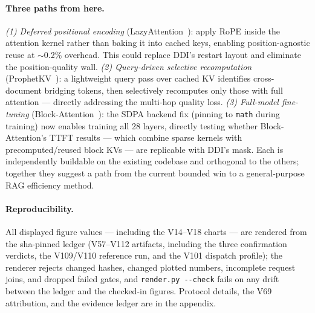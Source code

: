 \paragraph{Three paths from here.}
\textit{(1) Deferred positional encoding} (LazyAttention~\citep{xia2026lazyattention}):
apply RoPE inside the attention kernel rather than baking it into cached
keys, enabling position-agnostic reuse at $\sim$0.2\% overhead. This could
replace DDI's restart layout and eliminate the position-quality wall.
\textit{(2) Query-driven selective recomputation}
(ProphetKV~\citep{wang2026prophetkv}): a lightweight query pass over cached
KV identifies cross-document bridging tokens, then selectively recomputes
only those with full attention --- directly addressing the multi-hop quality
loss.
\textit{(3) Full-model fine-tuning} (Block-Attention~\citep{ma2025blockattention}):
the SDPA backend fix (pinning to \texttt{math} during training) now enables
training all 28 layers, directly testing whether Block-Attention's TTFT
results --- which combine sparse kernels with precomputed/reused block KVs
--- are replicable with DDI's mask.
Each is independently buildable on the existing codebase and orthogonal to
the others; together they suggest a path from the current bounded win to a
general-purpose RAG efficiency method.

\paragraph{Reproducibility.}
All displayed figure values --- including the V14--V18 charts --- are
rendered from the sha-pinned ledger (V57--V112 artifacts, including the
three confirmation verdicts, the V109/V110 reference run, and the V101
dispatch profile); the renderer rejects changed hashes, changed
plotted numbers, incomplete request joins, and dropped failed gates, and
\texttt{render.py -\/-check} fails on any drift between the ledger and the
checked-in figures. Protocol details, the V69 attribution, and the evidence
ledger are in the appendix.
